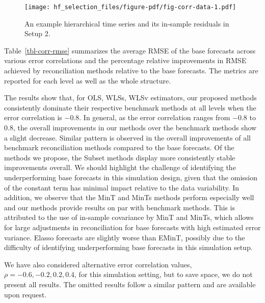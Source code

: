 \documentclass[11pt,a4paper,]{article}
\begin{document}
\begin{figure}

{\centering \texttt{[image: hf\_selection\_files/figure-pdf/fig-corr-data-1.pdf]}

}

\caption{\label{fig-corr-data}An example hierarchical time series and
its in-sample residuals in Setup 2.}

\end{figure}

Table~\ref{tbl-corr-rmse} summarizes the average RMSE of the base
forecasts across various error correlations and the percentage relative
improvements in RMSE achieved by reconciliation methods relative to the
base forecasts. The metrics are reported for each level as well as the
whole structure.

The results show that, for OLS, WLSs, WLSv estimators, our proposed
methods consistently dominate their respective benchmark methods at all
levels when the error correlation is \(-0.8\). In general, as the error
correlation ranges from \(-0.8\) to \(0.8\), the overall improvements in
our methods over the benchmark methods show a slight decrease. Similar
pattern is observed in the overall improvements of all benchmark
reconciliation methods compared to the base forecasts. Of the methods we
propose, the Subset methods display more consistently stable
improvements overall. We should highlight the challenge of identifying
the underperforming base forecasts in this simulation design, given that
the omission of the constant term has minimal impact relative to the
data variability. In addition, we observe that the MinT and MinTs
methods perform especially well and our methods provide results on par
with benchmark methods. This is attributed to the use of in-sample
covariance by MinT and MinTs, which allows for large adjustments in
reconciliation for base forecasts with high estimated error variance.
Elasso forecasts are slightly worse than EMinT, possibly due to the
difficulty of identifying underperforming base forecasts in this
simulation setup.

We have also considered alternative error correlation values,
\(\rho = -0.6, -0.2, 0.2, 0.4\), for this simulation setting, but to
save space, we do not present all results. The omitted results follow a
similar pattern and are available upon request.
\end{document}
